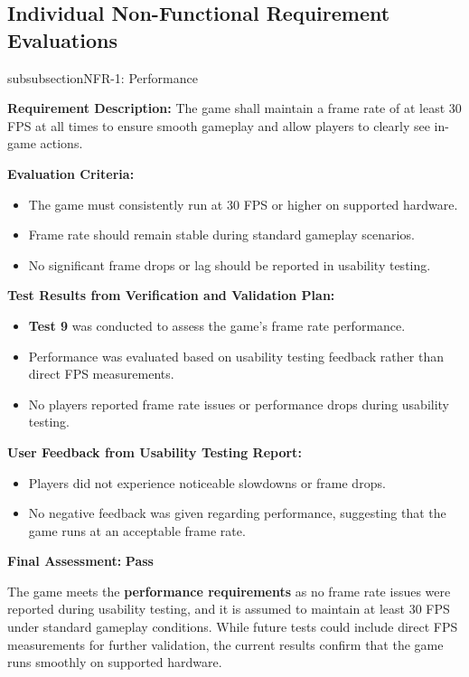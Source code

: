 \documentclass[12pt, titlepage]{article}
\begin{document}
\subsection{Individual Non-Functional Requirement Evaluations}

\*subsubsection{NFR-1: Performance}

\textbf{Requirement Description:}  
The game shall maintain a frame rate of at least 30 FPS at all times to ensure smooth gameplay and allow players to clearly see in-game actions.

\textbf{Evaluation Criteria:}  
\begin{itemize}
    \item The game must consistently run at 30 FPS or higher on supported hardware.
    \item Frame rate should remain stable during standard gameplay scenarios.
    \item No significant frame drops or lag should be reported in usability testing.
\end{itemize}

\textbf{Test Results from Verification and Validation Plan:}  
\begin{itemize}
    \item \textbf{Test 9} was conducted to assess the game's frame rate performance.
    \item Performance was evaluated based on usability testing feedback rather than direct FPS measurements.
    \item No players reported frame rate issues or performance drops during usability testing.
\end{itemize}

\textbf{User Feedback from Usability Testing Report:}  
\begin{itemize}
    \item Players did not experience noticeable slowdowns or frame drops.
    \item No negative feedback was given regarding performance, suggesting that the game runs at an acceptable frame rate.
\end{itemize}

\textbf{Final Assessment:} \textbf{Pass}  

The game meets the \textbf{performance requirements} as no frame rate issues were reported during usability testing, and it is assumed to maintain at least 30 FPS under standard gameplay conditions. While future tests could include direct FPS measurements for further validation, the current results confirm that the game runs smoothly on supported hardware.
\end{document}
